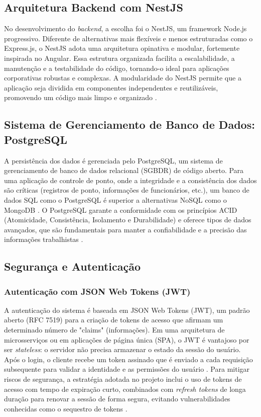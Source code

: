 \subsection{Arquitetura Backend com NestJS}
\par No desenvolvimento do \textit{backend}, a escolha foi o NestJS, um framework Node.js progressivo. Diferente de alternativas mais flexíveis e menos estruturadas como o Express.js, o NestJS adota uma arquitetura opinativa e modular, fortemente inspirada no Angular. Essa estrutura organizada facilita a escalabilidade, a manutenção e a testabilidade do código, tornando-o ideal para aplicações corporativas robustas e complexas. A modularidade do NestJS permite que a aplicação seja dividida em componentes independentes e reutilizáveis, promovendo um código mais limpo e organizado \cite{NestJSModular}.

\subsection{Sistema de Gerenciamento de Banco de Dados: PostgreSQL}
\par A persistência dos dados é gerenciada pelo PostgreSQL, um sistema de gerenciamento de banco de dados relacional (SGBDR) de código aberto. Para uma aplicação de controle de ponto, onde a integridade e a consistência dos dados são críticas (registros de ponto, informações de funcionários, etc.), um banco de dados SQL como o PostgreSQL é superior a alternativas NoSQL como o MongoDB \cite{PostgreSQLvsMongoDB_AWS}. O PostgreSQL garante a conformidade com os princípios ACID (Atomicidade, Consistência, Isolamento e Durabilidade) e oferece tipos de dados avançados, que são fundamentais para manter a confiabilidade e a precisão das informações trabalhistas \cite{PostgreSQLACID}.

\subsection{Segurança e Autenticação}

\subsubsection{Autenticação com JSON Web Tokens (JWT)}
\par A autenticação do sistema é baseada em JSON Web Tokens (JWT), um padrão aberto (RFC 7519) para a criação de tokens de acesso que afirmam um determinado número de "claims" (informações). Em uma arquitetura de microsserviços ou em aplicações de página única (SPA), o JWT é vantajoso por ser \textit{stateless}: o servidor não precisa armazenar o estado da sessão do usuário. Após o login, o cliente recebe um token assinado que é enviado a cada requisição subsequente para validar a identidade e as permissões do usuário \cite{JWTvsCookies}. Para mitigar riscos de segurança, a estratégia adotada no projeto inclui o uso de tokens de acesso com tempo de expiração curto, combinados com \textit{refresh tokens} de longa duração para renovar a sessão de forma segura, evitando vulnerabilidades conhecidas como o sequestro de tokens \cite{JWTVulnerabilities}.

